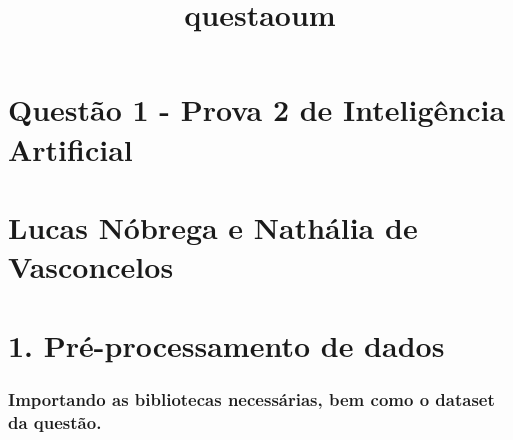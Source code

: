 \documentclass[11pt]{article}
\title{questaoum}
\begin{document}
    
    
    \maketitle
    
    

    
    \section{Questão 1 - Prova 2 de Inteligência
Artificial}\label{questuxe3o-1---prova-2-de-inteliguxeancia-artificial}

\section{Lucas Nóbrega e Nathália de
Vasconcelos}\label{lucas-nuxf3brega-e-nathuxe1lia-de-vasconcelos}

    \section{1. Pré-processamento de
dados}\label{pruxe9-processamento-de-dados}

    \subsubsection{Importando as bibliotecas necessárias, bem como o dataset
da
questão.}\label{importando-as-bibliotecas-necessuxe1rias-bem-como-o-dataset-da-questuxe3o.}
\end{document}
